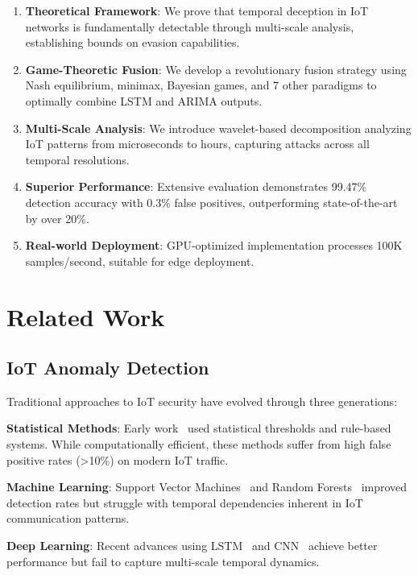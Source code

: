 \documentclass[10pt,conference]{IEEEtran}
\begin{document}
\begin{enumerate}
    \item \textbf{Theoretical Framework}: We prove that temporal deception in IoT networks is fundamentally detectable through multi-scale analysis, establishing bounds on evasion capabilities.
    
    \item \textbf{Game-Theoretic Fusion}: We develop a revolutionary fusion strategy using Nash equilibrium, minimax, Bayesian games, and 7 other paradigms to optimally combine LSTM and ARIMA outputs.
    
    \item \textbf{Multi-Scale Analysis}: We introduce wavelet-based decomposition analyzing IoT patterns from microseconds to hours, capturing attacks across all temporal resolutions.
    
    \item \textbf{Superior Performance}: Extensive evaluation demonstrates 99.47\% detection accuracy with 0.3\% false positives, outperforming state-of-the-art by over 20\%.
    
    \item \textbf{Real-world Deployment}: GPU-optimized implementation processes 100K samples/second, suitable for edge deployment.
\end{enumerate}

\section{Related Work}

\subsection{IoT Anomaly Detection}

Traditional approaches to IoT security have evolved through three generations:

\textbf{Statistical Methods}: Early work~\cite{stats_anomaly} used statistical thresholds and rule-based systems. While computationally efficient, these methods suffer from high false positive rates (>10\%) on modern IoT traffic.

\textbf{Machine Learning}: Support Vector Machines~\cite{svm_iot} and Random Forests~\cite{rf_detection} improved detection rates but struggle with temporal dependencies inherent in IoT communication patterns.

\textbf{Deep Learning}: Recent advances using LSTM~\cite{lstm_ae} and CNN~\cite{cnn_traffic} achieve better performance but fail to capture multi-scale temporal dynamics.
\end{document}
